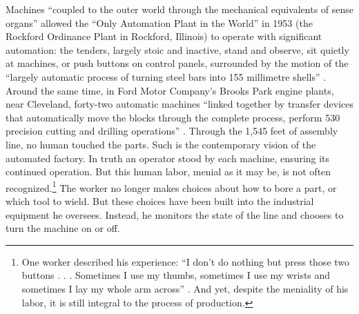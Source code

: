 Machines ``coupled to the
outer world through the mechanical equivalents of sense organs''
allowed the ``Only Automation Plant in the World'' in 1953 (the Rockford
Ordinance Plant in Rockford, Illinois) to operate with significant
automation: the tenders, largely stoic and inactive, stand
and observe, sit quietly at machines, or push buttons on control
panels, surrounded by the motion of the ``largely automatic process of
turning steel bars into 155 millimetre
shells'' \cite{wienerMachineThreat}. Around the same time, in Ford
Motor Company's Brooks Park engine plants, near Cleveland, forty-two
automatic machines ``linked together by transfer devices that
automatically move the blocks through the complete process, perform
530 precision cutting and drilling operations'' \cite[p.
  9]{dieboldImpact}. Through the 1,545 feet of assembly line, no human
touched the parts. Such is the contemporary vision of the automated factory. In
truth an operator stood by each machine, ensuring its continued
operation. But this human labor, menial as it may be, is not often
recognized.\footnote{One worker described his experience: ``I don't do nothing but
press those two buttons . . . Sometimes I use my thumbs, sometimes I
use my wrists and sometimes I lay my whole arm across'' \cite[p.
  10]{dieboldImpact}. And yet,
despite the meniality of his labor, it is still integral to the
process of production.} The worker
no longer makes choices about how to bore a part, or which tool to
wield. But these choices have been built into the industrial equipment
he oversees. Instead, he monitors the state of the line and chooses to
turn the machine on or off.

